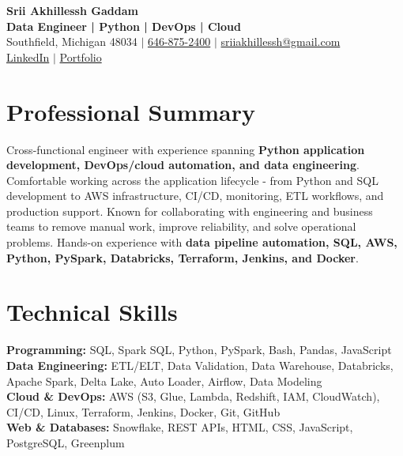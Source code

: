 \documentclass[letterpaper,10pt]{article}
\begin{document}
\fontsize{9.35pt}{10.45pt}\selectfont

\begin{center}
    {\LARGE \textbf{Srii Akhillessh Gaddam}} \\[-1pt]
    \textbf{Data Engineer | Python | DevOps | Cloud} \\[2pt]
    Southfield, Michigan 48034 $|$
    \href{tel:6468752400}{646-875-2400} $|$
    \href{mailto:sriiakhillessh@gmail.com}{sriiakhillessh@gmail.com} \\[1pt]
    \href{https://www.linkedin.com/in/srii-akhiilessh-gaddam-b48668191/}{LinkedIn} $|$
    \href{https://sriiakhillesshg.github.io/portfolio/}{Portfolio}
\end{center}
\vspace{-8pt}

\section{Professional Summary}
\small{Cross-functional engineer with experience spanning \textbf{Python application development, DevOps/cloud automation, and data engineering}. Comfortable working across the application lifecycle - from Python and SQL development to AWS infrastructure, CI/CD, monitoring, ETL workflows, and production support. Known for collaborating with engineering and business teams to remove manual work, improve reliability, and solve operational problems. Hands-on experience with \textbf{data pipeline automation, SQL, AWS, Python, PySpark, Databricks, Terraform, Jenkins, and Docker}.}

\section{Technical Skills}
\small{
\textbf{Programming:} SQL, Spark SQL, Python, PySpark, Bash, Pandas, JavaScript \\
\textbf{Data Engineering:} ETL/ELT, Data Validation, Data Warehouse, Databricks, Apache Spark, Delta Lake, Auto Loader, Airflow, Data Modeling \\
\textbf{Cloud \& DevOps:} AWS (S3, Glue, Lambda, Redshift, IAM, CloudWatch), CI/CD, Linux, Terraform, Jenkins, Docker, Git, GitHub \\
\textbf{Web \& Databases:} Snowflake, REST APIs, HTML, CSS, JavaScript, PostgreSQL, Greenplum
}
\end{document}
